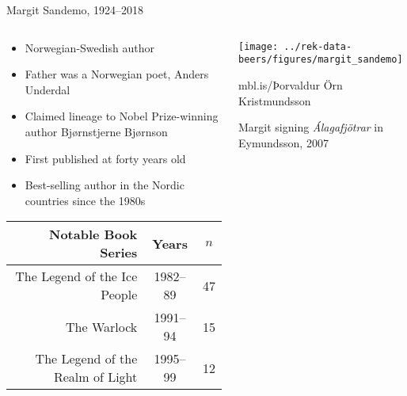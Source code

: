 \begin{frame}{Margit Sandemo, 1924--2018}
{{}}

    \begin{columns}[T]
        \begin{column}{0.6\textwidth}
            \begin{itemize}
                \item Norwegian-Swedish author
                \item Father was a Norwegian poet, Anders Underdal
                \item Claimed lineage to Nobel Prize-winning author Bjørnstjerne Bjørnson
                \item First published at forty years old
                \item Best-selling author in the Nordic countries since the 1980s
            \end{itemize}
            \vfill
            \begin{scriptsize}
                \begin{table}
                    \begin{tabular}{rcc}
                        \textbf{Notable Book Series}     & \textbf{Years} & $n$ \\ \midrule
                        The Legend of the Ice People     & 1982--89       & 47  \\
                        The Warlock                      & 1991--94       & 15  \\
                        The Legend of the Realm of Light & 1995--99       & 12
                    \end{tabular}
                \end{table}
            \end{scriptsize}
        \end{column}
        \begin{column}{0.4\textwidth}
            \centering
            \texttt{[image: ../rek-data-beers/figures/margit\_sandemo]}
            \begin{tiny}
                mbl.is/Þorvaldur Örn Kristmundsson
            \end{tiny}

            \vfill
            Margit signing \emph{Álagafjötrar} in Eymundsson, 2007
        \end{column}
    \end{columns}
\end{frame}

